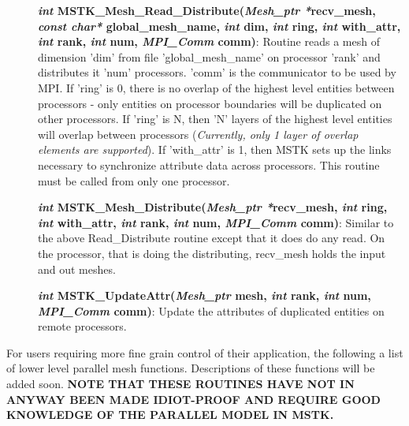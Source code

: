 \documentclass[12pt]{article}
\begin{document}
\begin{description}

\item[] {\bf {\em int} MSTK\_Mesh\_Read\_Distribute({\em Mesh\_ptr
      *}recv\_mesh, {\em const char*} global\_mesh\_name, {\em int} dim,
    {\em int} ring, {\em int} with\_attr, {\em int} rank, {\em int}
    num, {\em MPI\_Comm} comm)}: Routine reads a mesh of dimension
  'dim' from file 'global\_mesh\_name' on processor 'rank' and
  distributes it 'num' processors. 'comm' is the communicator to be
  used by MPI. If 'ring' is 0, there is no overlap of the highest
  level entities between processors - only entities on processor
  boundaries will be duplicated on other processors. If 'ring' is N,
  then 'N' layers of the highest level entities will overlap between
  processors ({\em Currently, only 1 layer of overlap elements are
    supported}). If 'with\_attr' is 1, then MSTK sets up the links
  necessary to synchronize attribute data across processors. This routine must be called from only one processor.

\item[] {\bf {\em int} MSTK\_Mesh\_Distribute({\em Mesh\_ptr
      *}recv\_mesh, {\em int} ring, {\em int} with\_attr, {\em int}
    rank, {\em int} num, {\em MPI\_Comm} comm)}: Similar to the above
  Read\_Distribute routine except that it does do any read. On the
  processor, that is doing the distributing, recv\_mesh holds the
  input and out meshes.


\item[] {\bf {\em int} MSTK\_UpdateAttr({\em Mesh\_ptr} mesh, {\em
      int} rank, {\em int} num, {\em MPI\_Comm} comm)}: Update the
  attributes of duplicated entities on remote processors.

\end{description}

For users requiring more fine grain control of their application, the
following a list of lower level parallel mesh functions. Descriptions
of these functions will be added soon. {\bf NOTE THAT THESE ROUTINES
  HAVE NOT IN ANYWAY BEEN MADE IDIOT-PROOF AND REQUIRE GOOD KNOWLEDGE
  OF THE PARALLEL MODEL IN MSTK.}
\end{document}
